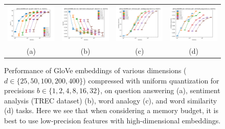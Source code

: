 \begin{figure}
	\centering
	\begin{tabular}{@{\hskip -0.0in}c@{\hskip -0.0in}c@{\hskip -0.0in}c@{\hskip -0.0in}c@{\hskip -0.0in}}
		\includegraphics[width=.245\linewidth]{figures/glove-wiki400k-am_qa_best-f1_vs_compression.pdf} &
		\includegraphics[width=.245\linewidth]{figures/glove-wiki400k-am_trec_test-err_vs_compression.pdf} &
		\includegraphics[width=.245\linewidth]{figures/glove-wiki400k-am_intrinsics_analogy-avg-score_vs_compression.pdf} &
		\includegraphics[width=.245\linewidth]{figures/glove-wiki400k-am_intrinsics_similarity-avg-score_vs_compression.pdf} \\
		\;\;\;\;\;(a) & \;\;\;\;\;\;(b) & \;\;\;\;\;\;(c) & \;\;\;\;\;\;(d)
	\end{tabular}			
\caption{
Performance of GloVe embeddings of various dimensions ($d\in\{25,50,100,200,400\}$) compressed with uniform quantization for precisions $b \in \{1,2,4,8,16,32\}$, on question answering (a), sentiment analysis (TREC dataset) (b), word analogy (c), and word similarity (d) tasks.
Here we see that when considering a memory budget, it is best to use low-precision features with high-dimensional embeddings. }
\label{fig:dimVsPrec}
\end{figure}

